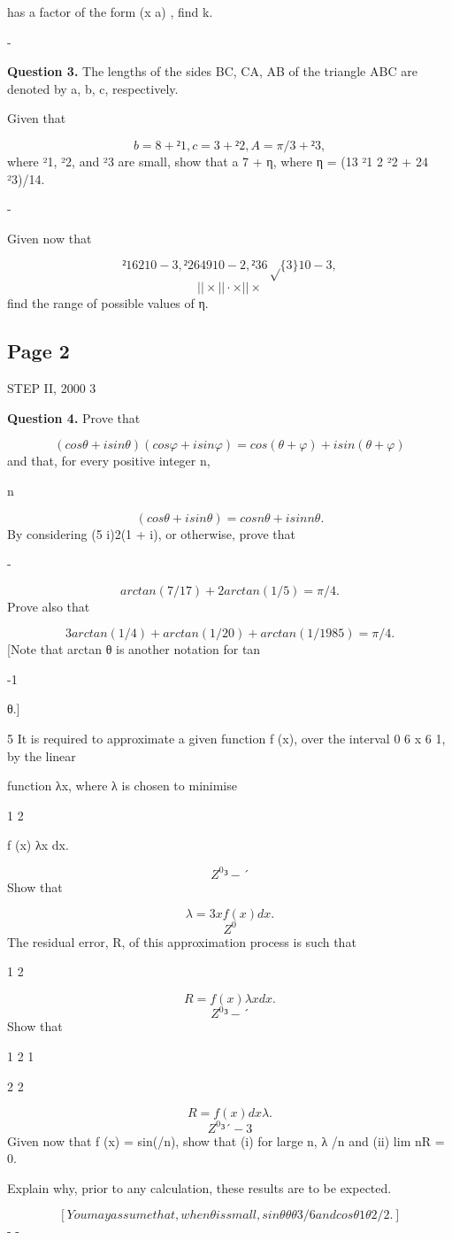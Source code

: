 \documentclass[12pt]{article}
\begin{document}
\begin{flushleft}
has a factor of the form (x a) , find k.\par
-\par
\bigskip\textbf{Question 3.} The lengths of the sides BC, CA, AB of the triangle ABC are denoted by a, b, c, respectively.\par
Given that\par
\[b = 8 + ²1, c = 3 + ²2, A = \pi/3 + ²3,\]
where ²1, ²2, and ²3 are small, show that a 7 + η, where η = (13 ²1 2 ²2 + 24 ²3)/14.\par
\approx -\par
Given now that\par
\[²1 6 2 10 -3 , ²2 6 4 9 10 -2 , ²3 6 \sqrt\{3\} 10 -3 ,\]
\[| | \times | | · \times | | \times\]
find the range of possible values of η.\par
\end{flushleft}
\subsection*{Page 2}
\begin{flushleft}
STEP II, 2000 3\par
\bigskip\textbf{Question 4.} Prove that\par
\[(cos θ + i sin θ)(cos φ + i sin φ) = cos(θ + φ) + i sin(θ + φ)\]
and that, for every positive integer n,\par
n\par
\[(cos θ + i sin θ) = cos nθ + i sin nθ.\]
By considering (5 i)2(1 + i), or otherwise, prove that\par
-\par
\[arctan(7/17) + 2 arctan(1/5) = \pi/4.\]
Prove also that\par
\[3 arctan(1/4) + arctan(1/20) + arctan(1/1985) = \pi/4.\]
[Note that arctan θ is another notation for tan\par
-1\par
θ.]\par
5 It is required to approximate a given function f (x), over the interval 0 6 x 6 1, by the linear\par
function λx, where λ is chosen to minimise\par
1 2\par
f (x) λx dx.\par
\[Z^0 ³ - ´\]
Show that\par
\[λ = 3 xf (x) dx.\]
\[Z^0\]
The residual error, R, of this approximation process is such that\par
1 2\par
\[R = f (x) λx dx.\]
\[Z^0 ³ - ´\]
Show that\par
1 2 1\par
2 2\par
\[R = f (x) dx λ .\]
\[Z^0 ³ ´ - 3\]
Given now that f (x) = sin(\pix/n), show that (i) for large n, λ \pi/n and (ii) lim n\to\infty R = 0.\par
\approx\par
Explain why, prior to any calculation, these results are to be expected.\par
\[[You may assume that, when θ is small, sin θ θ θ3/6 and cos θ 1 θ2/2.]\]
\approx - \approx -\par
\end{flushleft}
\end{document}
